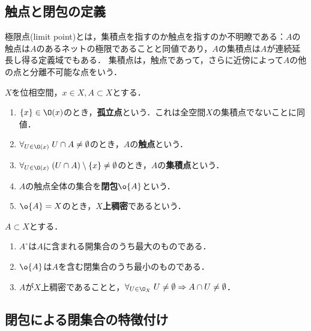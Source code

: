 \documentclass[uplatex,dvipdfmx]{jsreport}
\begin{document}
\subsection{触点と閉包の定義}

\begin{tcolorbox}[colframe=ForestGreen, colback=ForestGreen!10!white,breakable,colbacktitle=ForestGreen!40!white,coltitle=black,fonttitle=\bfseries\sffamily,
title=]
    極限点(limit point)とは，集積点を指すのか触点を指すのか不明瞭である：$A$の触点は$A$のあるネットの極限であることと同値であり，$A$の集積点は$A$が連続延長し得る定義域でもある．
    集積点は，触点であって，さらに近傍によって$A$の他の点と分離不可能な点をいう．
\end{tcolorbox}

\begin{definition}
    $X$を位相空間，$x\in X,A\subset X$とする．
    \begin{enumerate}
        \item $\{x\}\in\O(x)$のとき，\textbf{孤立点}という．これは全空間$X$の集積点でないことに同値．
        \item $\forall_{U\in\O(x)}\;U\cap A\ne\emptyset$のとき，$A$の\textbf{触点}という．
        \item $\forall_{U\in\O(x)}\;(U\cap A)\setminus\{x\}\ne\emptyset$のとき，$A$の\textbf{集積点}という．
        \item $A$の触点全体の集合を\textbf{閉包}$\o{A}$という．
        \item $\o{A}=X$のとき，\textbf{$X$上稠密}であるという．
    \end{enumerate}
\end{definition}

\begin{proposition}[開核，閉包，稠密性の特徴付け]
    $A\subset X$とする．
    \begin{enumerate}
        \item $A^\circ$は$A$に含まれる開集合のうち最大のものである．
        \item $\o{A}$は$A$を含む閉集合のうち最小のものである．
        \item $A$が$X$上稠密であることと，$\forall_{U\in\O_X}\;U\ne\emptyset\Rightarrow A\cap U\ne\emptyset$．
    \end{enumerate}
\end{proposition}

\subsection{閉包による閉集合の特徴付け}
\end{document}
